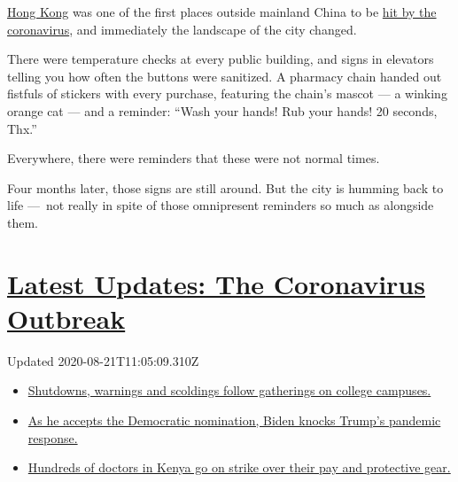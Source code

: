 \href{https://www.nytimes3xbfgragh.onion/2020/07/20/world/asia/hong-kong-coronavirus.html}{Hong
Kong} was one of the first places outside mainland China to be
\href{https://www.scmp.com/news/hong-kong/health-environment/article/3047193/china-coronavirus-first-case-confirmed-hong-kong}{hit
by the coronavirus}, and immediately the landscape of the city changed.

There were temperature checks at every public building, and signs in
elevators telling you how often the buttons were sanitized. A pharmacy
chain handed out fistfuls of stickers with every purchase, featuring the
chain's mascot --- a winking orange cat --- and a reminder: ``Wash your
hands! Rub your hands! 20 seconds, Thx.''

Everywhere, there were reminders that these were not normal times.

Four months later, those signs are still around. But the city is humming
back to life ---~not really in spite of those omnipresent reminders so
much as alongside them.

\hypertarget{latest-updates-the-coronavirus-outbreak}{%
\section{\texorpdfstring{\href{https://www.nytimes3xbfgragh.onion/2020/08/21/world/covid-19-coronavirus.html?action=click\&pgtype=Article\&state=default\&region=MAIN_CONTENT_1\&context=storylines_live_updates}{Latest
Updates: The Coronavirus
Outbreak}}{Latest Updates: The Coronavirus Outbreak}}\label{latest-updates-the-coronavirus-outbreak}}

Updated 2020-08-21T11:05:09.310Z

\begin{itemize}
\tightlist
\item
  \href{https://www.nytimes3xbfgragh.onion/2020/08/21/world/covid-19-coronavirus.html?action=click\&pgtype=Article\&state=default\&region=MAIN_CONTENT_1\&context=storylines_live_updates\#link-4690b6aa}{Shutdowns,
  warnings and scoldings follow gatherings on college campuses.}
\item
  \href{https://www.nytimes3xbfgragh.onion/2020/08/21/world/covid-19-coronavirus.html?action=click\&pgtype=Article\&state=default\&region=MAIN_CONTENT_1\&context=storylines_live_updates\#link-324af071}{As
  he accepts the Democratic nomination, Biden knocks Trump's pandemic
  response.}
\item
  \href{https://www.nytimes3xbfgragh.onion/2020/08/21/world/covid-19-coronavirus.html?action=click\&pgtype=Article\&state=default\&region=MAIN_CONTENT_1\&context=storylines_live_updates\#link-35890b73}{Hundreds
  of doctors in Kenya go on strike over their pay and protective gear.}
\end{itemize}

